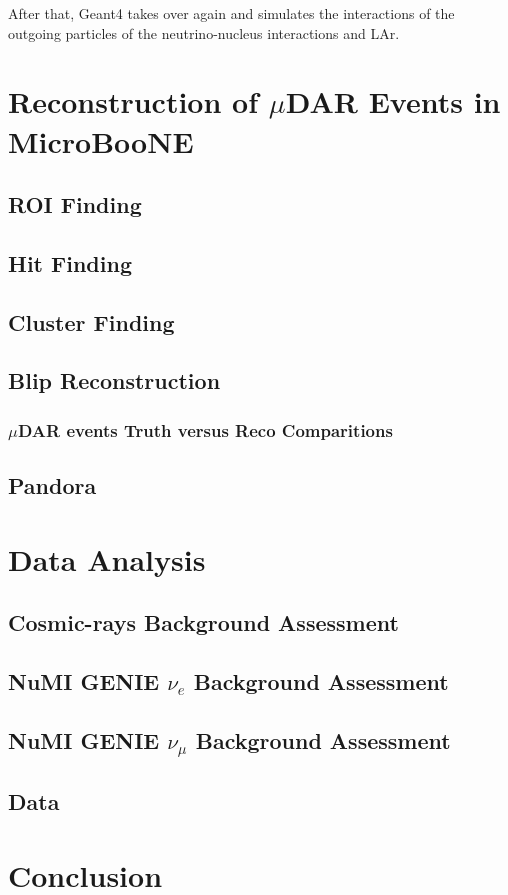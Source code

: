 After that, Geant4 takes over again and simulates the interactions of the outgoing particles of the neutrino-nucleus interactions and LAr. 

\section{Reconstruction of $\mu$DAR Events in MicroBooNE}
\subsection{ROI Finding}
\subsection{Hit Finding}
\subsection{Cluster Finding}
\subsection{Blip Reconstruction}
\subsubsection{$\mu$DAR events Truth versus Reco Comparitions}
\subsection{Pandora}

\section{Data Analysis}
\subsection{Cosmic-rays Background Assessment}
\subsection{NuMI GENIE $\nu_e$ Background Assessment}
\subsection{NuMI GENIE $\nu_{\mu}$ Background Assessment}
\subsection{Data}
\section{Conclusion}